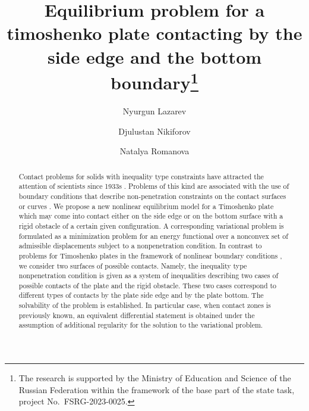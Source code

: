 \documentclass[12pt]{llncs}
\begin{document}
\fi
%
\title{Equilibrium problem for a timoshenko plate contacting by the side edge and the bottom boundary\thanks{The research is
supported by the Ministry of Education and Science of the Russian
Federation within the framework of the base part of the state
task, project No.~FSRG-2023-0025.}}
\author{Nyurgun Lazarev   \and  Djulustan Nikiforov  \and  Natalya Romanova
}

\maketitle

\begin{abstract}
Contact problems for solids with inequality type constraints have
attracted the attention of scientists since 1933s
\cite{Sign,KhludnevKovtunenko}. Problems of this kind are
associated with the use of boundary conditions that describe
non-penetration constraints on the contact surfaces or curves
\cite{KhludnevKovtunenko,RudoyESIAM}. We propose a new nonlinear
equilibrium model for a Timoshenko plate which may come into
contact either on the side edge or on the bottom surface with a
rigid obstacle of a certain given configuration. A corresponding
variational problem is formulated as a minimization problem for an
energy functional over a nonconvex set of admissible displacements
subject to a nonpenetration condition. In contrast to problems for
Timoshenko plates in the framework of nonlinear boundary
conditions \cite{laz1,laz2}, we consider two surfaces of possible
contacts. Namely, the inequality type nonpenetration condition is
given as a system of inequalities describing two cases of possible
contacts of the plate and the rigid obstacle. These two cases
correspond to different types of contacts by the plate side edge
and by the plate bottom. The solvability of the problem is
established. In particular case, when contact zones is previously
known, an equivalent differential statement is obtained under the
assumption of additional regularity for the solution to the
variational problem.

\end{abstract}
\end{document}
